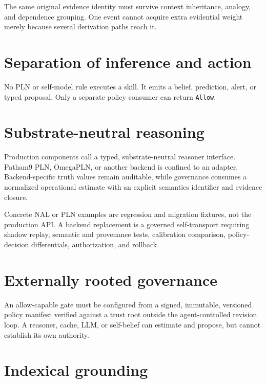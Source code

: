 \documentclass[11pt,oneside]{report}
\begin{document}
The same original evidence identity must survive context inheritance, analogy, and dependence grouping. One event cannot acquire extra evidential weight merely because several derivation paths reach it.

\section{Separation of inference and action}

\begin{invariantbox}
No PLN or self-model rule executes a skill. It emits a belief, prediction, alert, or typed proposal. Only a separate policy consumer can return \texttt{Allow}.
\end{invariantbox}

\section{Substrate-neutral reasoning}

\begin{invariantbox}
Production components call a typed, substrate-neutral reasoner interface. Patham9 PLN, OmegaPLN, or another backend is confined to an adapter. Backend-specific truth values remain auditable, while governance consumes a normalized operational estimate with an explicit semantics identifier and evidence closure.
\end{invariantbox}

Concrete NAL or PLN examples are regression and migration fixtures, not the production API. A backend replacement is a governed self-transport requiring shadow replay, semantic and provenance tests, calibration comparison, policy-decision differentials, authorization, and rollback.

\section{Externally rooted governance}

\begin{invariantbox}
An allow-capable gate must be configured from a signed, immutable, versioned policy manifest verified against a trust root outside the agent-controlled revision loop. A reasoner, cache, LLM, or self-belief can estimate and propose, but cannot establish its own authority.
\end{invariantbox}

\section{Indexical grounding}
\end{document}
